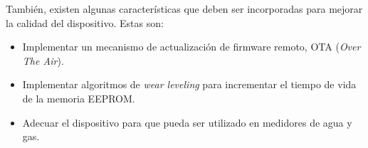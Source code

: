 También, existen algunas características que deben ser incorporadas para mejorar la calidad del dispositivo. Estas son:

\begin{itemize}
	\item Implementar un mecanismo de actualización de firmware remoto, OTA (\textit{Over The Air}).
	\item Implementar algoritmos de \textit{wear leveling} para incrementar el tiempo de
	 vida de la memoria EEPROM.
	\item Adecuar el dispositivo para que pueda ser utilizado en medidores de agua y gas.
\end{itemize}
